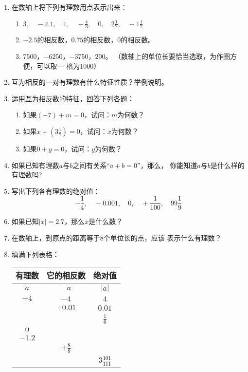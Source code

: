 \begin{enumerate}
\item 在数轴上将下列有理数用点表示出来：
\begin{enumerate}
    \item $3,\quad -4.1,\quad 1,\quad -\frac{4}{3},\quad 0,\quad 2\frac{1}{2},\quad -1\frac{1}{2}$
    \item $-2.5$的相反数，$0.75$的相反数，0的相反数。
    \item $7500$，$-6250$，$-3750$，$200$。
    （数轴上的单位长要恰当选取，为作图方便，可以取一
格为1000）
\end{enumerate}


\item 互为相反的一对有理数有什么特征性质？举例说明。
\item 运用互为相反数的特征，回答下列各题：
\begin{enumerate}
    \item 如果$(-7) +m=0$，试问：$m$为何数？
    \item 如果$x+\left(3\frac{1}{7}\right)=0$，试问：$x$为何数？
    \item 如果$0+y=0$，试问：$y$为何数？
\end{enumerate}


\item 如果已知有理数$a$与$b$之间有关系“$a+b=0$”，那么，
你能知道$a$与$b$是什么样的有理数吗?
\item 写出下列各有理数的绝对值：
\[-\frac{1}{4},\quad -0.001,\quad 0,\quad +\frac{1}{100},\quad 99\frac{1}{9}\]

\item 如果已知$|x|= 2.7$，那么$x$是什么数？
\item 在数轴上，到原点的距离等于8个单位长的点，应该
表示什么有理数？
\item 填满下列表格：
\begin{center}
    \begin{tabular}{ccc}
\hline
有理数&它的相反数&绝对值\\
\hline
$a$  &   $-a$   &   $|a|$\\ 
$+4$  &   $-4$   &   $4$\\ 
  &   $+0.01$   &   $0.01$\\ 
  &      &   $\frac{1}{6}$\\ 
$0$  &      &   \\ 
$-1.2$  &      &   \\ 
  &   $+\frac{8}{9}$   &   \\ 
  &      &   $3\frac{101}{111}$\\ 
\hline
    \end{tabular}
\end{center}


\end{enumerate}
